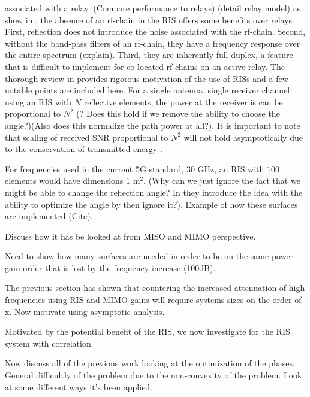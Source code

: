 \documentclass[12pt,a4paper]{report}
\begin{document}
associated with a relay. (Compare performance to relays) (detail relay model) as show in \cite{bjornson2019demystifying}, the absence of an rf-chain in the RIS offers some benefits over relays. First, reflection does not introduce the noise associated with the rf-chain. Second, without the band-pass filters of an rf-chain, they have a frequency response over the entire spectrum (explain). Third, they are inherently full-duplex, a feature that is difficult to implement for co-located rf-chains on an active relay. 
The thorough review in \cite{basar2019wireless} provides rigorous motivation of the use of RISs and a few notable points are included here.
For a single antenna, single receiver channel using an RIS with $N$ reflective elements, the power at the receiver is can be proportional to $N^2$ (? Does this hold if we remove the ability to choose the angle?)(Also does this normalize the path power at all?). It is important to note that scaling of received SNR proportional to $N^2$ will not hold asymptotically due to the conservation of transmitted energy \cite{bjornson2019demystifying}.

For frequencies used in the current 5G standard, 30 GHz, an RIS with $100$ elements would have dimensions $1$ $\text{m}^2$.
(Why can we just ignore the fact that we might be able to change the reflection angle? In \cite{basar2019wireless} they introduce the idea with the ability to optimize the angle by then ignore it?).
Example of how these surfaces are implemented (Cite).

Discuss how it has be looked at from MISO and MIMO perspective.
\par
Need to show how many surfaces are needed in order to be on the same power gain order that is lost by the frequency increase (100dB).
\par
The previous section has shown that countering the increased attenuation of high frequencies using RIS and MIMO gains will require systems 
sizes on the order of x. Now motivate using asymptotic analysis.
\par

\par
Motivated by the potential benefit of the RIS, we now investigate for the RIS system with correlation

\par
Now discuss all of the previous work looking at the optimization of the phases. 
General difficultly of the problem due to the non-convexity of the problem. Look at some different ways it's been applied.
\end{document}
